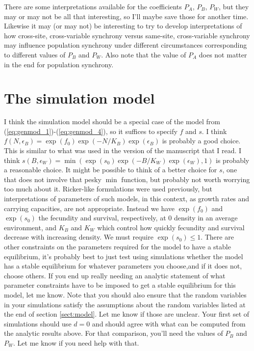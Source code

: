 \documentclass[letterpaper,11pt]{article}
\begin{document}
There are some interpretations available for the coefficients $P_A$, $P_B$, $P_W$,
but they may or may not be all that interesting, so I'll maybe save those for
another time. Likewise it may (or may not) be interesting to try to develop
interpretations of how cross-site, cross-variable synchrony versus same-site,
cross-variable synchrony may influence population synchrony under 
different circumstances corresponding to different values of $P_B$ and $P_W$.
Also note that the value of $P_A$ does not matter in the end for population
synchrony.

\section{The simulation model}

I think the simulation model should be a special case of the model from 
(\ref{eq:genmod_1})-(\ref{eq:genmod_4}), so it suffices to specify $f$ and $s$.
I think $f(N,\epsilon_B)=\exp(f_0)\exp(-N/K_B)\exp(\epsilon_B)$
is probably a good choice. This is similar to what was used in the version
of the manuscript that I read.
I think $s(B,\epsilon_W)=\min ( \exp(s_0) \exp(-B/K_W) \exp(\epsilon_W),1 )$
is probably a reasonable choice. It might be 
possible to think of a better choice for
$s$, one that does not involve that pesky $\min$ function, but probably not worth 
worrying too much about it. Ricker-like formulations were used previously, but
interpretations of parameters of such models, in this context, as
growth rates and carrying capacities, are not appropriate. Instead we
have $\exp(f_0)$ and $\exp(s_0)$ the fecundity and survival, respectively,
at $0$ density in an average environment, and $K_B$ and $K_W$ 
which control how quickly fecundity and
survival decrease with increasing density. We must require $\exp(s_0) \leq 1$.
There are other constraints on the parameters required for the model
to have a stable equilibrium, it's probably best to just test using simulations
whether the model has a stable equilibrium for whatever parameters you 
choose,and if it does not, choose others. If you end up really needing an 
analytic statement of what parameter constraints have to be imposed to get
a stable equilibrium for this model, let me know.
Note that you should also ensure that the random variables in your simulations
satisfy the assumptions about the random variables listed at the end 
of section \ref{sect:model}. Let me know if those are unclear. 
Your first set of simulations should use $d=0$ and should agree with 
what can be computed from the analytic results above. For that comparison,
you'll need the values of $P_B$ and $P_W$. Let me know if you need help with
that.
\end{document}
